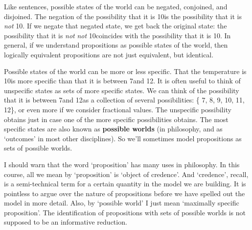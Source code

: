 Like sentences, possible states of the world can be negated,
conjoined, and disjoined. The negation of the possibility that it is
10\celsius is the possibility that it is \emph{not} 10\celsius. If we
negate that negated state, we get back the original state: the
possibility that it is \emph{not} \emph{not} 10\celsius coincides with
the possibility that it is 10\celsius. In general, if we understand
propositions as possible states of the world, then logically
equivalent propositions are not just equivalent, but identical.


Possible states of the world can be more or less specific. That the
temperature is 10\celsius is more specific than that it is between
7\celsius and 12\celsius. It is often useful to think of unspecific
states as sets of more specific states. We can think of the
possibility that it is between 7\celsius and 12\celsius as a
collection of several possibilities: \{ 7\celsius, 8\celsius,
9\celsius, 10\celsius, 11\celsius, 12\celsius \}, or even more if we
consider fractional values. The unspecific possibility obtains just in
case one of the more specific possibilities obtains. The most specific
states are also known as \textbf{possible worlds} (in philosophy, and
as `outcomes' in most other disciplines). So we'll sometimes model
propositions as sets of possible worlds.

I should warn that the word `proposition' has many uses in
philosophy. In this course, all we mean by `proposition' is `object of
credence'. And `credence', recall, is a semi-technical term for a
certain quantity in the model we are building. It is pointless to
argue over the nature of propositions before we have spelled out the
model in more detail. Also, by `possible world' I just mean `maximally
specific proposition'. The identification of propositions with sets of
possible worlds is not supposed to be an informative reduction.

